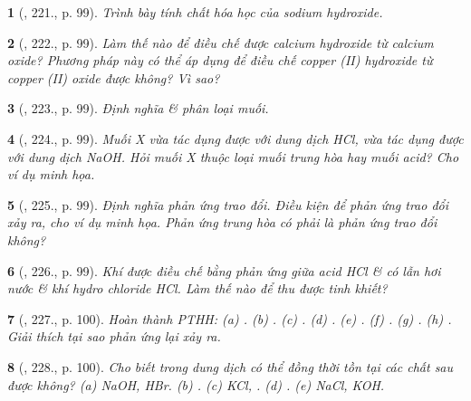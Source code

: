 \documentclass{article}
\newtheorem{baitoan}{}
\begin{document}
\begin{baitoan}[\cite{Nguyen_Buu_Can_500_BT_Hoa_Hoc_THCS}, 221., p. 99]
	Trình bày tính chất hóa học của sodium hydroxide.
\end{baitoan}

\begin{baitoan}[\cite{Nguyen_Buu_Can_500_BT_Hoa_Hoc_THCS}, 222., p. 99]
	Làm thế nào để điều chế được calcium hydroxide từ calcium oxide? Phương pháp này có thể áp dụng để điều chế copper (II) hydroxide từ copper (II) oxide được không? Vì sao?
\end{baitoan}

\begin{baitoan}[\cite{Nguyen_Buu_Can_500_BT_Hoa_Hoc_THCS}, 223., p. 99]
	Định nghĩa \& phân loại muối.
\end{baitoan}

\begin{baitoan}[\cite{Nguyen_Buu_Can_500_BT_Hoa_Hoc_THCS}, 224., p. 99]
	Muối X vừa tác dụng được với dung dịch {\rm HCl}, vừa tác dụng được với dung dịch {\rm NaOH}. Hỏi muối X thuộc loại muối trung hòa hay muối acid? Cho ví dụ minh họa.
\end{baitoan}

\begin{baitoan}[\cite{Nguyen_Buu_Can_500_BT_Hoa_Hoc_THCS}, 225., p. 99]
	Định nghĩa phản ứng trao đổi. Điều kiện để phản ứng trao đổi xảy ra, cho ví dụ minh họa. Phản ứng trung hòa có phải là phản ứng trao đổi không?
\end{baitoan}

\begin{baitoan}[\cite{Nguyen_Buu_Can_500_BT_Hoa_Hoc_THCS}, 226., p. 99]
	Khí {\rm{}} được điều chế bằng phản ứng giữa acid {\rm HCl \& } có lẫn hơi nước \& khí hydro chloride {\rm HCl}. Làm thế nào để thu được {\rm{}} tinh khiết?
\end{baitoan}

\begin{baitoan}[\cite{Nguyen_Buu_Can_500_BT_Hoa_Hoc_THCS}, 227., p. 100]
	Hoàn thành {\rm PTHH}: {\rm(a) . (b) . (c) . (d) . (e) . (f) . (g) . (h) }. Giải thích tại sao phản ứng lại xảy ra.
\end{baitoan}

\begin{baitoan}[\cite{Nguyen_Buu_Can_500_BT_Hoa_Hoc_THCS}, 228., p. 100]
	Cho biết trong dung dịch có thể đồng thời tồn tại các chất sau được không? {\rm(a) NaOH, HBr. (b) . (c) KCl, . (d) . (e) NaCl, KOH}.
\end{baitoan}
\end{document}
